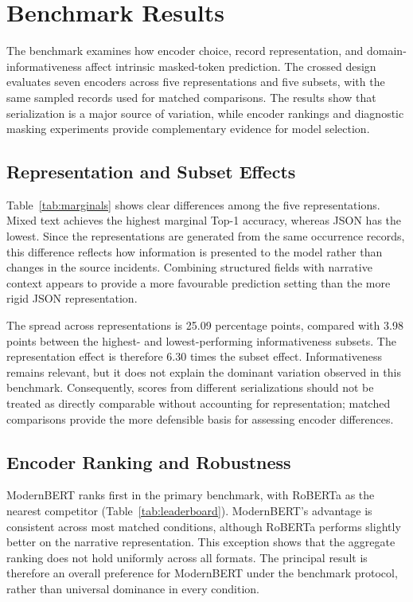 \section{Benchmark Results}
\label{sec:results}

The benchmark examines how encoder choice, record representation, and domain-informativeness affect intrinsic masked-token prediction. The crossed design evaluates seven encoders across five representations and five subsets, with the same sampled records used for matched comparisons. The results show that serialization is a major source of variation, while encoder rankings and diagnostic masking experiments provide complementary evidence for model selection.

\subsection{Representation and Subset Effects}
\label{sec:repr}


Table~\ref{tab:marginals} shows clear differences among the five representations. Mixed text achieves the highest marginal Top-1 accuracy, whereas JSON has the lowest. Since the representations are generated from the same occurrence records, this difference reflects how information is presented to the model rather than changes in the source incidents. Combining structured fields with narrative context appears to provide a more favourable prediction setting than the more rigid JSON representation.

The spread across representations is 25.09 percentage points, compared with 3.98 points between the highest- and lowest-performing informativeness subsets. The representation effect is therefore 6.30 times the subset effect. Informativeness remains relevant, but it does not explain the dominant variation observed in this benchmark. Consequently, scores from different serializations should not be treated as directly comparable without accounting for representation; matched comparisons provide the more defensible basis for assessing encoder differences.

\subsection{Encoder Ranking and Robustness}
\label{sec:ranking}


ModernBERT ranks first in the primary benchmark, with RoBERTa as the nearest competitor (Table~\ref{tab:leaderboard}). ModernBERT's advantage is consistent across most matched conditions, although RoBERTa performs slightly better on the narrative representation. This exception shows that the aggregate ranking does not hold uniformly across all formats. The principal result is therefore an overall preference for ModernBERT under the benchmark protocol, rather than universal dominance in every condition.

